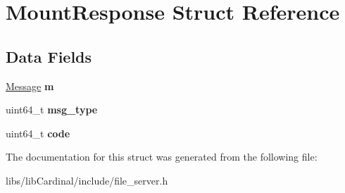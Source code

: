 \hypertarget{structMountResponse}{}\section{Mount\+Response Struct Reference}
\label{structMountResponse}
\subsection*{Data Fields}
\begin{DoxyCompactItemize}
\item 
\hyperlink{structMessage}{Message} {\bfseries m}\hypertarget{structMountResponse_a8d1ef3542a8a6a5af3e089e10e553ac2}{}\label{structMountResponse_a8d1ef3542a8a6a5af3e089e10e553ac2}

\item 
uint64\+\_\+t {\bfseries msg\+\_\+type}\hypertarget{structMountResponse_ac17da7beaa54bf98c574167ced52a57f}{}\label{structMountResponse_ac17da7beaa54bf98c574167ced52a57f}

\item 
uint64\+\_\+t {\bfseries code}\hypertarget{structMountResponse_a97d7d3264a2da33f439db62d0e9e2e8f}{}\label{structMountResponse_a97d7d3264a2da33f439db62d0e9e2e8f}

\end{DoxyCompactItemize}


The documentation for this struct was generated from the following file\+:\begin{DoxyCompactItemize}
\item 
libs/lib\+Cardinal/include/file\+\_\+server.\+h\end{DoxyCompactItemize}
